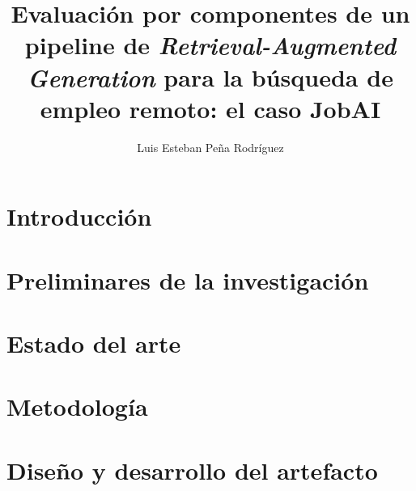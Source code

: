 \documentclass[12pt]{MIA-USA}
\title{Evaluaci\'on por componentes de un pipeline de \textit{Retrieval-Augmented Generation} para la b\'usqueda de empleo remoto: el caso JobAI}
\author{Luis Esteban Pe\~na Rodr\'iguez}
\begin{document}
	
	\maketitle
 	
	
    
    \tableofcontents
    \listoffigures
    \listoftables
    
    
    
    \chapter{Introducci\'on}
    
    
    \chapter{Preliminares de la investigaci\'on}
    \label{cap:problema}
    
    
    \chapter{Estado del arte}
    \label{cap:estado-arte}
    
    
    \chapter{Metodolog\'ia}
    \label{cap:metodologia}
    
    
    \chapter{Dise\~no y desarrollo del artefacto}
    \label{cap:artefacto}
    
    
\end{document}

